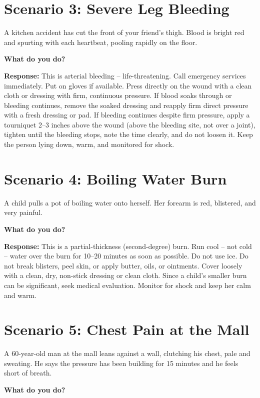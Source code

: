 \section{Scenario 3: Severe Leg Bleeding}

A kitchen accident has cut the front of your friend's thigh. Blood is bright red and spurting with each heartbeat, pooling rapidly on the floor.

\textbf{What do you do?}

\textbf{Response:} This is arterial bleeding -- life-threatening. Call emergency services immediately. Put on gloves if available. Press directly on the wound with a clean cloth or dressing with firm, continuous pressure. If blood soaks through or bleeding continues, remove the soaked dressing and reapply firm direct pressure with a fresh dressing or pad. If bleeding continues despite firm pressure, apply a tourniquet 2--3 inches above the wound (above the bleeding site, not over a joint), tighten until the bleeding stops, note the time clearly, and do not loosen it. Keep the person lying down, warm, and monitored for shock.

\section{Scenario 4: Boiling Water Burn}

A child pulls a pot of boiling water onto herself. Her forearm is red, blistered, and very painful.

\textbf{What do you do?}

\textbf{Response:} This is a partial-thickness (second-degree) burn. Run cool -- not cold -- water over the burn for 10--20 minutes as soon as possible. Do not use ice. Do not break blisters, peel skin, or apply butter, oils, or ointments. Cover loosely with a clean, dry, non-stick dressing or clean cloth. Since a child's smaller burn can be significant, seek medical evaluation. Monitor for shock and keep her calm and warm.

\section{Scenario 5: Chest Pain at the Mall}

A 60-year-old man at the mall leans against a wall, clutching his chest, pale and sweating. He says the pressure has been building for 15 minutes and he feels short of breath.

\textbf{What do you do?}

